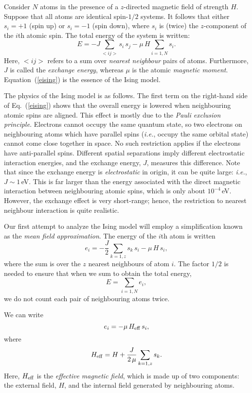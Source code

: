 Consider $N$ atoms in the presence of a $z$-directed magnetic field of
strength $H$. Suppose that all
atoms are identical spin-$1/2$ systems. It follows that either $s_i=+1$
(spin up) or $s_i=-1$ (spin down), where $s_i$ is (twice) the $z$-component
of the $i$th atomic spin. The total energy of the system is
written:
\begin{equation}\label{eising}
E = - J\sum_{<i j>}s_i\,s_j -\mu\,H\sum_{i=1,N}s_i.
\end{equation}
Here, $<i j>$ refers to a sum over {\em nearest neighbour} pairs of atoms.
Furthermore, $J$ is called the {\em exchange energy}, whereas $\mu$ is the
atomic {\em magnetic moment}. Equation~(\ref{eising}) is the essence of the
Ising model.

The physics of the Ising model is as follows. The first term on the right-hand
side of Eq.~(\ref{eising}) shows that the overall energy is lowered when
neighbouring atomic spins are aligned. This effect is mostly
due to the {\em Pauli exclusion principle}. Electrons cannot occupy the same quantum
state, so two electrons on neighbouring atoms which have parallel spins
({\em i.e.}, occupy the same orbital state) cannot come close together in
space. No such restriction applies if the electrons have anti-parallel
spins. Different spatial separations imply different electrostatic
interaction energies, and the exchange energy, $J$, measures this difference.
Note that since the exchange energy is {\em electrostatic} in origin, it
can be quite large: {\em i.e.}, $J\sim 1$\,eV. This is far larger than the
energy associated with the direct magnetic interaction between neighbouring
atomic spins, which
is only about $10^{-4}$\,eV. However, the exchange effect is very short-range; hence,
the restriction to nearest neighbour interaction is quite realistic.

Our first attempt to analyze the Ising model will employ a simplification
known as the {\em mean field approximation}. The energy of the $i$th atom is written
\begin{equation}
e_i = -\frac{J}{2}\sum_{k=1,z}s_k\,s_i -\mu\,H\,s_i,
\end{equation}
where  the sum is over the $z$ nearest neighbours of atom $i$. The factor $1/2$
is needed to ensure that when we sum to obtain the total energy,
\begin{equation}
E =\sum_{i=1,N} e_i,
\end{equation}
we do not count each pair of neighbouring atoms twice.

We can write
\begin{equation}
e_i = -\mu\,H_{\rm eff}\,s_i,
\end{equation}
where
\begin{equation}
H_{\rm eff} = H + \frac{J}{2\,\mu}\sum_{k=1,z}s_k.
\end{equation}
Here, $H_{\rm eff}$ is the {\em effective magnetic field}, which is
made up of two components: the external field, $H$, and the internal
field generated by neighbouring atoms.

